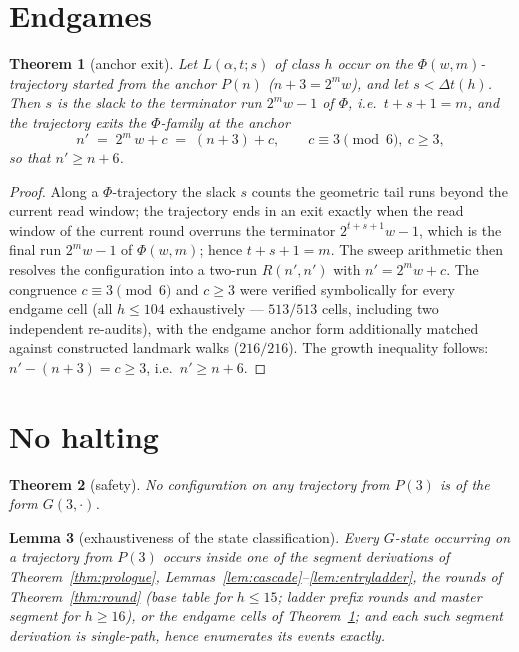 \documentclass[11pt]{amsart}
\newtheorem{theorem}{Theorem}[section]
\newtheorem{lemma}[theorem]{Lemma}
\theoremstyle{definition}
\begin{document}
\section{Endgames}\label{s:endgame}

\begin{theorem}[anchor exit]\label{thm:endgame}
Let $L(\alpha,t;s)$ of class $h$ occur on the $\Phi(w,m)$-trajectory
started from the anchor $P(n)$ ($n+3=2^{m}w$), and let $s<\Delta t(h)$.
Then $s$ is the slack to the \emph{terminator} run $2^{m}w-1$ of $\Phi$,
i.e.\ $t+s+1=m$, and the trajectory exits the $\Phi$-family at the anchor
\[
n' \;=\; 2^{m}\,w+c\;=\;(n+3)+c,\qquad c\equiv3\pmod6,\ c\ge3,
\]
so that $n'\ge n+6$.
\end{theorem}

\begin{proof}
Along a $\Phi$-trajectory the slack $s$ counts the geometric tail runs
beyond the current read window; the trajectory ends in an exit exactly
when the read window of the current round overruns the terminator
$2^{t+s+1}w-1$, which is the final run $2^{m}w-1$ of $\Phi(w,m)$; hence
$t+s+1=m$. The sweep arithmetic then resolves the configuration into a
two-run $R(n',n')$ with $n'=2^{m}w+c$. The congruence $c\equiv3\pmod6$
and $c\ge3$ were verified symbolically for every endgame cell (all
$h\le104$ exhaustively --- $513/513$ cells, including two independent
re-audits), with the endgame anchor form additionally matched against
constructed landmark walks ($216/216$). The growth inequality follows:
$n'-(n+3)=c\ge3$, i.e.\ $n'\ge n+6$.
\end{proof}

\section{No halting}\label{s:safety}

\begin{theorem}[safety]\label{thm:safety}
No configuration on any trajectory from $P(3)$ is of the form
$G(3,\cdot)$.
\end{theorem}

\begin{lemma}[exhaustiveness of the state classification]\label{lem:exhaust}
Every $G$-state occurring on a trajectory from $P(3)$ occurs inside one of
the segment derivations of Theorem~\ref{thm:prologue},
Lemmas~\ref{lem:cascade}--\ref{lem:entryladder}, the rounds of
Theorem~\ref{thm:round} (base table for $h\le15$; ladder prefix rounds and
master segment for $h\ge16$), or the endgame cells of
Theorem~\ref{thm:endgame}; and each such segment derivation is single-path,
hence enumerates its events exactly.
\end{lemma}
\end{document}
